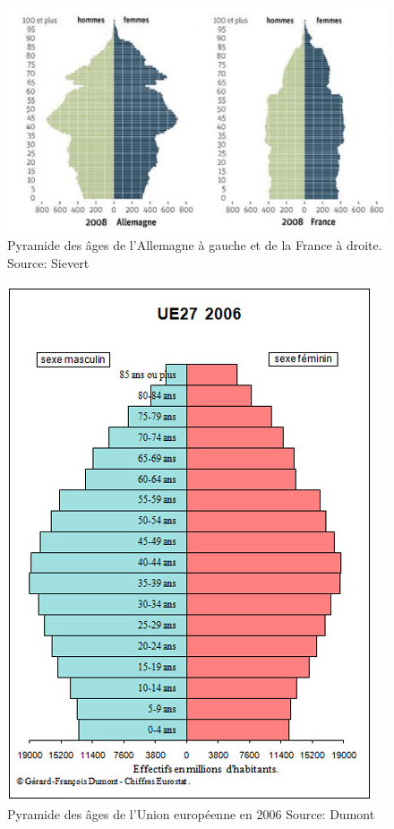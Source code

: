\begin{figure}[p]
    \begin{center}
        \includegraphics[scale=0.55]{document/pyfrde.png}
        \caption{Pyramide des âges de l'Allemagne à gauche et de la France à droite. Source: Sievert~\citep[pp.27]{frde}}
        \label{pyfrde}
    \end{center}
\end{figure}

\begin{figure}[p]
    \begin{center}
        \includegraphics[scale=0.55]{document/eu-2006.png}
        \caption{Pyramide des âges de l'Union européenne en 2006 Source: Dumont~\citep[pp.3]{pyramide-eu}}
        \label{eu-2006}
    \end{center}
\end{figure}


